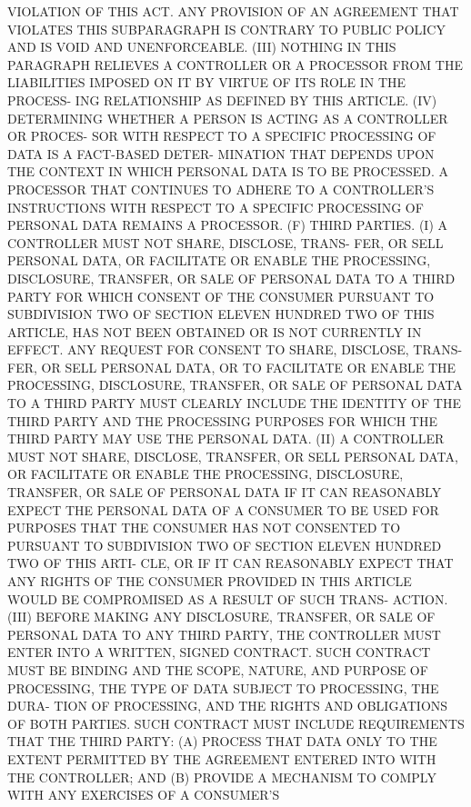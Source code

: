  VIOLATION  OF THIS ACT. ANY PROVISION OF AN AGREEMENT THAT VIOLATES THIS
 SUBPARAGRAPH IS CONTRARY TO PUBLIC POLICY AND IS VOID AND UNENFORCEABLE.
   (III)  NOTHING  IN THIS PARAGRAPH RELIEVES A CONTROLLER OR A PROCESSOR
 FROM THE LIABILITIES IMPOSED ON IT BY VIRTUE OF ITS ROLE IN THE PROCESS-
 ING RELATIONSHIP AS DEFINED BY THIS ARTICLE.
   (IV) DETERMINING WHETHER A PERSON IS ACTING AS A CONTROLLER OR PROCES-
 SOR WITH RESPECT TO A SPECIFIC PROCESSING OF DATA IS A FACT-BASED DETER-
 MINATION THAT DEPENDS UPON THE CONTEXT IN WHICH PERSONAL DATA IS  TO  BE
 PROCESSED.  A  PROCESSOR  THAT  CONTINUES  TO  ADHERE  TO A CONTROLLER'S
 INSTRUCTIONS WITH RESPECT TO A  SPECIFIC  PROCESSING  OF  PERSONAL  DATA
 REMAINS A PROCESSOR.
   (F)  THIRD  PARTIES. (I) A CONTROLLER MUST NOT SHARE, DISCLOSE, TRANS-
 FER, OR SELL PERSONAL DATA, OR  FACILITATE  OR  ENABLE  THE  PROCESSING,
 DISCLOSURE,  TRANSFER,  OR  SALE  OF  PERSONAL DATA TO A THIRD PARTY FOR
 WHICH CONSENT OF THE CONSUMER PURSUANT TO  SUBDIVISION  TWO  OF  SECTION
 ELEVEN  HUNDRED  TWO  OF  THIS  ARTICLE, HAS NOT BEEN OBTAINED OR IS NOT
 CURRENTLY IN EFFECT. ANY REQUEST FOR CONSENT TO SHARE, DISCLOSE,  TRANS-
 FER,  OR  SELL PERSONAL DATA, OR TO FACILITATE OR ENABLE THE PROCESSING,
 DISCLOSURE, TRANSFER, OR SALE OF PERSONAL DATA TO  A  THIRD  PARTY  MUST
 CLEARLY  INCLUDE  THE  IDENTITY  OF  THE  THIRD PARTY AND THE PROCESSING
 PURPOSES FOR WHICH THE THIRD PARTY MAY USE THE PERSONAL DATA.
   (II) A CONTROLLER MUST NOT SHARE, DISCLOSE, TRANSFER, OR SELL PERSONAL
 DATA, OR FACILITATE OR ENABLE THE PROCESSING, DISCLOSURE,  TRANSFER,  OR
 SALE OF PERSONAL DATA IF IT CAN REASONABLY EXPECT THE PERSONAL DATA OF A
 CONSUMER  TO BE USED FOR PURPOSES THAT THE CONSUMER HAS NOT CONSENTED TO
 PURSUANT TO SUBDIVISION TWO OF SECTION ELEVEN HUNDRED TWO OF THIS  ARTI-
 CLE,  OR  IF  IT  CAN  REASONABLY EXPECT THAT ANY RIGHTS OF THE CONSUMER
 PROVIDED IN THIS ARTICLE WOULD BE COMPROMISED AS A RESULT OF SUCH TRANS-
 ACTION.
   (III) BEFORE MAKING ANY DISCLOSURE, TRANSFER, OR SALE OF PERSONAL DATA
 TO ANY THIRD PARTY, THE CONTROLLER MUST ENTER  INTO  A  WRITTEN,  SIGNED
 CONTRACT.  SUCH  CONTRACT  MUST  BE  BINDING  AND THE SCOPE, NATURE, AND
 PURPOSE OF PROCESSING, THE TYPE OF DATA SUBJECT TO PROCESSING, THE DURA-
 TION OF PROCESSING, AND THE RIGHTS  AND  OBLIGATIONS  OF  BOTH  PARTIES.
 SUCH CONTRACT MUST INCLUDE REQUIREMENTS THAT THE THIRD PARTY:
   (A)  PROCESS  THAT  DATA ONLY TO THE EXTENT PERMITTED BY THE AGREEMENT
 ENTERED INTO WITH THE CONTROLLER; AND
   (B) PROVIDE A MECHANISM TO COMPLY WITH ANY EXERCISES OF  A  CONSUMER'S
